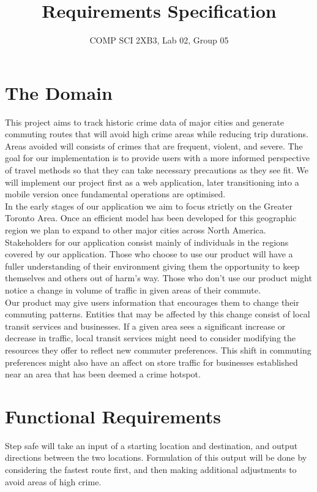 \documentclass[12pt]{article}
\title{Requirements Specification}
\author{COMP SCI 2XB3, Lab 02, Group 05}
\begin{document}
\maketitle

\section {The Domain}

This project aims to track historic crime data of major cities and generate commuting routes that will avoid high crime areas while reducing trip durations. Areas avoided will consists of crimes that are frequent, violent, and severe. The goal for our implementation is to provide users with a more informed perspective of travel methods so that they can take necessary precautions as they see fit. We will implement our project first as a web application, later transitioning into a mobile version once fundamental operations are optimised. \\

In the early stages of our application we aim to focus strictly on the Greater Toronto Area. Once an efficient model has been developed for this geographic region we plan to expand to other major cities across North America.\\

	Stakeholders for our application consist mainly of individuals in the regions covered by our application. Those who choose to use our product will have a fuller understanding of their environment giving them the opportunity to keep themselves and others out of harm’s way. Those who don’t use our product might notice a change in volume of traffic in given areas of their commute.\\
	
	Our product may give users information that encourages them to change their commuting patterns. Entities that may be affected by this change consist of local transit services and businesses. If a given area sees a significant increase or decrease in traffic, local transit services might need to consider modifying the resources they offer to reflect new commuter preferences. This shift in commuting preferences might also have an affect on store traffic for businesses established near an area that has been deemed a crime hotspot.

\section {Functional Requirements}
Step safe will take an input of a starting location and destination, and output directions between the two locations. Formulation of this output will be done by considering the fastest route first, and then making additional adjustments to avoid areas of high crime. 
\end{document}
